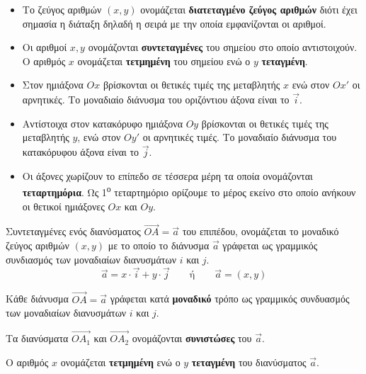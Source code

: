\documentclass[twoside,nofonts,internet,shmeiwseis]{thewria}
\begin{document}
\vspace{-2mm}
\begin{itemize}
\item Το ζεύγος αριθμών $(x,y)$ ονομάζεται \textbf{διατεταγμένο ζεύγος αριθμών} διότι έχει σημασία η διάταξη δηλαδή η σειρά με την οποία εμφανίζονται οι αριθμοί.
\item Οι αριθμοί $x,y$ ονομάζονται \textbf{συντεταγμένες} του σημείου στο οποίο αντιστοιχούν. Ο αριθμός $x$ ονομάζεται \textbf{τετμημένη} του σημείου ενώ ο $y$ \textbf{τεταγμένη}.
\item Στον ημιάξονα $ Ox $ βρίσκονται οι θετικές τιμές της μεταβλητής $x$ ενώ στον $ Ox' $ οι αρνητικές. Το μοναδιαίο διάνυσμα του οριζόντιου άξονα είναι το $ \vec{i} $.
\item Αντίστοιχα στον κατακόρυφο ημιάξονα $ Oy $ βρίσκονται οι θετικές τιμές της μεταβλητής $y$, ενώ στον $ Oy' $ οι αρνητικές τιμές. Το μοναδιαίο διάνυσμα του κατακόρυφου άξονα είναι το $ \vec{j} $.
\item Οι άξονες χωρίζουν το επίπεδο σε τέσσερα μέρη τα οποία ονομάζονται \textbf{τεταρτημόρια}. Ως 1\textsuperscript{ο} τεταρτημόριο ορίζουμε το μέρος εκείνο στο οποίο ανήκουν οι θετικοί ημιάξονες $ Ox $ και $ Oy $.
\end{itemize}
Συντεταγμένες ενός διανύσματος $ \overrightarrow{OA}=\vec{a} $ του επιπέδου, ονομάζεται το μοναδικό ζεύγος αριθμών $ (x,y) $ με το οποίο το διάνυσμα $ \vec{a} $ γράφεται ως γραμμικός συνδιασμός των μοναδιαίων διανυσμάτων $ i $ και $ j $.
\[ \vec{a}=x\cdot\vec{i}+y\cdot\vec{j}\qquad\textrm{ή}\qquad\vec{a}=(x,y) \]
{\begin{rlist}
\item Κάθε διάνυσμα $ \overrightarrow{OA}=\vec{a} $ γράφεται κατά \textbf{μοναδικό} τρόπο ως γραμμικός συνδυασμός των μοναδιαίων διανυσμάτων $ i $ και $ j $.
\item Τα διανύσματα $ \overrightarrow{OA_1} $ και $ \overrightarrow{OA_2} $ ονομάζονται \textbf{συνιστώσες} του $ \vec{a} $.
\item Ο αριθμός $x$ ονομάζεται \textbf{τετμημένη} ενώ ο $y$ \textbf{τεταγμένη} του διανύσματος $ \vec{a} $.
\end{rlist}}\\\\\\
\end{document}
